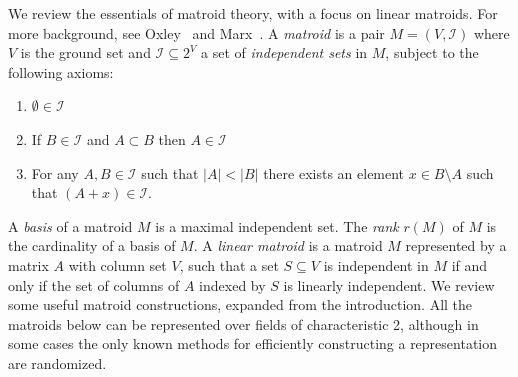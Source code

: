 \documentclass[10pt,a4paper]{article}
\newcommand{\cI}{\ensuremath{\mathcal I}\xspace}
\begin{document}
We review the essentials of matroid theory, with a focus on linear
matroids. For more background, see Oxley~\cite{OxleyBook}
and Marx~\cite{Marx09-matroid}.
A \emph{matroid} is a pair $M=(V,\cI)$ where $V$ is the ground set 
and $\cI \subseteq 2^V$ a set of \emph{independent sets} in
$M$, subject to the following axioms:
\begin{enumerate}
\item $\emptyset \in \cI$
\item If $B \in \cI$ and $A \subset B$ then $A \in \cI$
\item For any $A, B \in \cI$ such that $|A|<|B|$ there exists an
  element $x \in B \setminus A$ such that $(A+x) \in \cI$.
\end{enumerate}
A \emph{basis} of a matroid $M$ is a maximal independent set.
The \emph{rank} $r(M)$ of $M$ is the cardinality of a basis of $M$. 
A \emph{linear matroid} is a matroid $M$ represented by a matrix $A$ with
column set $V$, such that a set $S \subseteq V$ is independent in $M$
if and only if the set of columns of $A$ indexed by $S$ is linearly independent.
We review some useful matroid constructions, expanded from the introduction.
All the matroids below can be represented over fields of characteristic 2,
although in some cases the only known methods for efficiently constructing a
representation are randomized.
\end{document}
